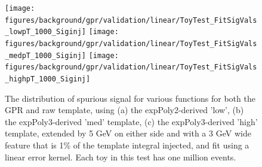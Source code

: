 \begin{figure} 
\begin{center}
  \texttt{[image: figures/background/gpr/validation/linear/ToyTest\_FitSigVals\_lowpT\_1000\_Siginj]}   
  \texttt{[image: figures/background/gpr/validation/linear/ToyTest\_FitSigVals\_medpT\_1000\_Siginj]}   
  \texttt{[image: figures/background/gpr/validation/linear/ToyTest\_FitSigVals\_highpT\_1000\_Siginj]}   
\caption{The distribution of spurious signal for various functions for both the GPR and raw template, using (a) the expPoly2-derived 'low', (b) the expPoly3-derived 'med' template, (c) the expPoly3-derived 'high' template, extended by 5 GeV on either side and with a 3 GeV wide feature that is 1\% of the template integral injected, and fit using a linear error kernel. Each toy in this test has one million events.}
\label{fig:linearkernel_lowpt_1000_Siginj}
\end{center}
\end{figure}

